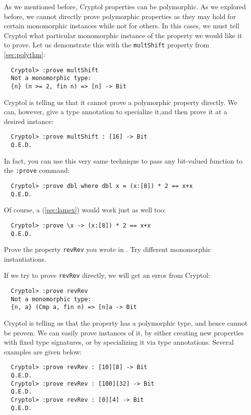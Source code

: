 As we mentioned before, Cryptol properties can be polymorphic. As we
explored before, we cannot directly prove polymorphic properties as
they may hold for certain monomorphic instances while not for others.
In this cases, we must tell Cryptol what particular monomorphic
instance of the property we would like it to prove.  Let us
demonstrate this with the \texttt{multShift} property from
\autoref{sec:polythm}:
\begin{Verbatim}
  Cryptol> :prove multShift
  Not a monomorphic type:
  {n} (n >= 2, fin n) => [n] -> Bit
\end{Verbatim}
Cryptol is telling us that it cannot prove a polymorphic property
directly. We can, however, give a type annotation to specialize
it,\indTypeAnnotation and then prove it at a desired instance:
\begin{Verbatim}
  Cryptol> :prove multShift : [16] -> Bit
  Q.E.D.
\end{Verbatim}
In fact, you can use this very same technique to pass any bit-valued
function to the {\tt :prove} command:\indCmdProve\indWhere
\begin{Verbatim}
  Cryptol> :prove dbl where dbl x = (x:[8]) * 2 == x+x
  Q.E.D.
\end{Verbatim}
Of course, a \lamex (\autoref{sec:lamex}) would work just as well
too:\indLamExp
\begin{Verbatim}
  Cryptol> :prove \x -> (x:[8]) * 2 == x+x
  Q.E.D.
\end{Verbatim}

\begin{Exercise}\label{ex:prove:1}
  Prove the property {\tt revRev} you wrote in
  . Try different
  monomorphic instantiations.
\end{Exercise}
\begin{Answer}
  If we try to prove {\tt revRev} directly, we will get an error from
  Cryptol:
\begin{Verbatim}
  Cryptol> :prove revRev
  Not a monomorphic type:
  {n, a} (Cmp a, fin n) => [n]a -> Bit
\end{Verbatim}
Cryptol is telling us that the property has a polymorphic type, and
hence cannot be proven. We can easily prove instances of it, by either
creating new properties with fixed type signatures\indSignature, or by
specializing it via type annotations\indTypeAnnotation. Several
examples are given below:
\begin{Verbatim}
  Cryptol> :prove revRev : [10][8] -> Bit
  Q.E.D.
  Cryptol> :prove revRev : [100][32] -> Bit
  Q.E.D.
  Cryptol> :prove revRev : [0][4] -> Bit
  Q.E.D.
\end{Verbatim}
\end{Answer}


